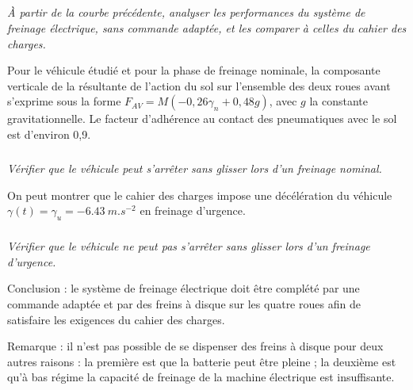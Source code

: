 \documentclass[10pt,fleqn]{article} %
\begin{document}
\begin{multicols}{2}
\begin{center}
\end{center}

\subparagraph{}\textit{À partir de la courbe précédente, analyser les performances du système de freinage électrique, sans
commande adaptée, et les comparer à celles du cahier des charges.}
\ifprof
\begin{corrige}
\end{corrige}
\else
\fi

Pour le véhicule étudié et pour la phase de freinage nominale, la composante verticale de la résultante de
l’action du sol sur l’ensemble des deux roues avant s’exprime sous la forme $F_{AV} = M(-0,26\gamma_n + 0,48g)$, avec $g$ la constante gravitationnelle. Le facteur d’adhérence au contact des pneumatiques avec le sol est d’environ 0,9.

\subparagraph{}\textit{Vérifier que le véhicule peut s’arrêter sans glisser lors d’un freinage nominal.}
\ifprof
\begin{corrige}
\end{corrige}
\else
\fi

On peut montrer que le cahier des charges impose une décélération du véhicule $\gamma(t) = \gamma_u = -\SI{6,43}{m.s^{-2}}$ en freinage d’urgence.

\subparagraph{}\textit{Vérifier que le véhicule ne peut pas s’arrêter sans glisser lors d’un freinage d’urgence.}
\ifprof
\begin{corrige}
\end{corrige}
\else
\fi

Conclusion : le système de freinage électrique doit être complété par une commande adaptée et par des freins
à disque sur les quatre roues afin de satisfaire les exigences du cahier des charges.

Remarque : il n’est pas possible de se dispenser des freins à disque pour deux autres raisons : la première est
que la batterie peut être pleine ; la deuxième est qu’à bas régime la capacité de freinage de la machine électrique
est insuffisante.
\ifprof
\else
\end{multicols}
\fi
\end{document}
